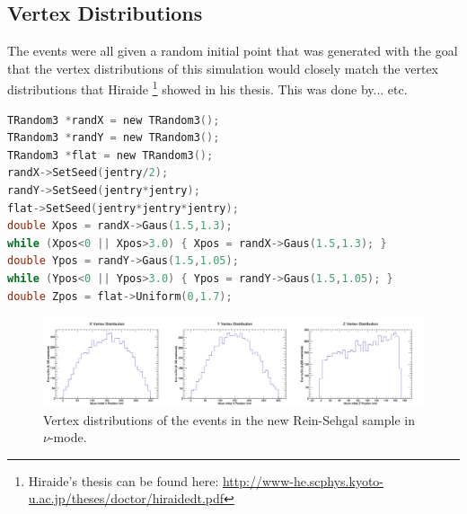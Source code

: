 \documentclass[11pt]{article}
\begin{document}
\subsection{Vertex Distributions}
The events were all given a random initial point that was generated with the goal that the vertex distributions of this simulation would closely match the vertex distributions that Hiraide \footnote{Hiraide's thesis can be found here: \href{http://www-he.scphys.kyoto-u.ac.jp/theses/doctor/hiraide_dt.pdf}{http://www-he.scphys.kyoto-u.ac.jp/theses/doctor/hiraide\textunderscore{}dt.pdf}} showed in his thesis. This was done by... etc.

\begin{lstlisting}[language=C]
TRandom3 *randX = new TRandom3();
TRandom3 *randY = new TRandom3();
TRandom3 *flat = new TRandom3();
randX->SetSeed(jentry/2);
randY->SetSeed(jentry*jentry);
flat->SetSeed(jentry*jentry*jentry);
double Xpos = randX->Gaus(1.5,1.3);
while (Xpos<0 || Xpos>3.0) { Xpos = randX->Gaus(1.5,1.3); }
double Ypos = randY->Gaus(1.5,1.05);
while (Ypos<0 || Ypos>3.0) { Ypos = randY->Gaus(1.5,1.05); }
double Zpos = flat->Uniform(0,1.7);
\end{lstlisting}


\begin{figure}[H]
\centering
\includegraphics[width=1.0\textwidth]{EventClassifications/VertexDistributions.png}
\caption{Vertex distributions of the events in the new Rein-Sehgal sample in $\nu$-mode.}
\end{figure}





\end{document}
